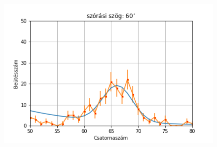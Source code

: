 \documentclass[a4paper,12pt]{article}
\begin{document}
\begin{figure}[!htb]
\begin{minipage}{.49\textwidth}
    \end{minipage}%
    \begin{minipage}{.49\textwidth}
        \centering
        \includegraphics[width=1.\linewidth]{../plots/withbackground/60_962fit.png}
    \end{minipage}
\end{figure}
\end{document}
